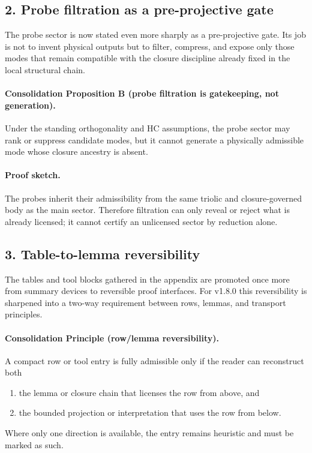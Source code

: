 \subsection*{2. Probe filtration as a pre-projective gate}
The probe sector is now stated even more sharply as a pre-projective gate. Its
job is not to invent physical outputs but to filter, compress, and expose only
those modes that remain compatible with the closure discipline already fixed in
the local structural chain.

\paragraph{Consolidation Proposition B (probe filtration is gatekeeping, not generation).}
Under the standing orthogonality and HC assumptions, the probe sector may rank or
suppress candidate modes, but it cannot generate a physically admissible mode
whose closure ancestry is absent.

\paragraph{Proof sketch.}
The probes inherit their admissibility from the same triolic and closure-governed
body as the main sector. Therefore filtration can only reveal or reject what is
already licensed; it cannot certify an unlicensed sector by reduction alone.

\subsection*{3. Table-to-lemma reversibility}
The tables and tool blocks gathered in the appendix are promoted once more from
summary devices to reversible proof interfaces. For v1.8.0 this reversibility
is sharpened into a two-way requirement between rows, lemmas, and transport
principles.

\paragraph{Consolidation Principle (row/lemma reversibility).}
A compact row or tool entry is fully admissible only if the reader can reconstruct
both
\begin{enumerate}[leftmargin=2em,label=(\alph*)]
  \item the lemma or closure chain that licenses the row from above, and
  \item the bounded projection or interpretation that uses the row from below.
\end{enumerate}
Where only one direction is available, the entry remains heuristic and must be
marked as such.

